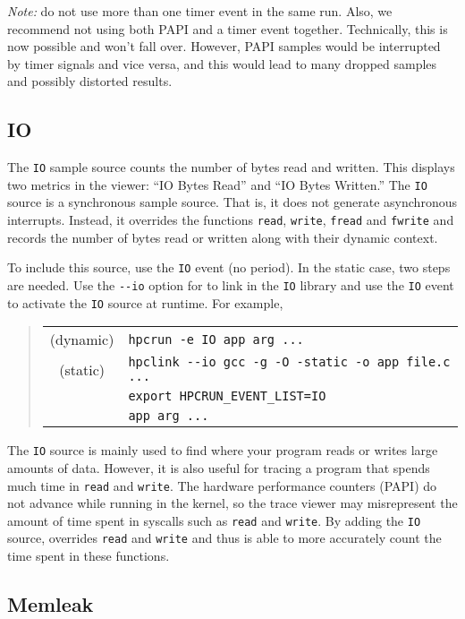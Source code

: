 {\it Note:} do not use more than one timer event in the same run.
Also, we recommend not using both PAPI and a timer event together.
Technically, this is now possible and \hpcrun{} won't fall over.
However, PAPI samples would be interrupted by timer signals and vice
versa, and this would lead to many dropped samples and possibly
distorted results.

\subsection{IO}

The \verb|IO| sample source counts the number of bytes read and
written.  This displays two metrics in the viewer: ``IO Bytes Read''
and ``IO Bytes Written.''  The \verb|IO| source is a synchronous sample
source.  That is, it does not generate asynchronous interrupts.
Instead, it overrides the functions \verb|read|, \verb|write|, \verb|fread|
and \verb|fwrite| and records the number of bytes read or
written along with their dynamic context.

To include this source, use the \verb|IO| event (no period).  In the
static case, two steps are needed.  Use the \verb|--io| option for
\hpclink{} to link in the \verb|IO| library and use the \verb|IO| event
to activate the \verb|IO| source at runtime.  For example,

\begin{quote}
\begin{tabular}{@{}cl}
(dynamic) & \verb|hpcrun -e IO app arg ...| \\
(static)  & \verb|hpclink --io gcc -g -O -static -o app file.c ...| \\
& \verb|export HPCRUN_EVENT_LIST=IO| \\
& \verb|app arg ...|
\end{tabular}
\end{quote}

The \verb|IO| source is mainly used to find where your program reads or
writes large amounts of data.  However, it is also useful for tracing
a program that spends much time in \verb|read| and \verb|write|.  The
hardware performance counters (PAPI) do not advance while running in
the kernel, so the trace viewer may misrepresent the amount of time
spent in syscalls such as \verb|read| and \verb|write|.  By adding the
\verb|IO| source, \hpcrun{} overrides \verb|read| and \verb|write| and
thus is able to more accurately count the time spent in these
functions.

\subsection{Memleak}

